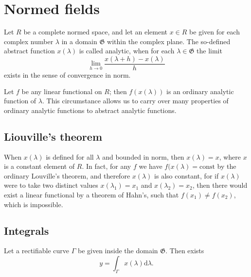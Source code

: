 \documentclass{article}
\theoremstyle{definition}
\newcommand{\intd}[3]{\int_{#1}{#2}\mathrm{d}#3}
\begin{document}
\section{Normed fields}
Let $R$ be a complete normed space, and let an element $x\in R$ be given for each complex number $\lambda$ in a domain $\mathfrak{G}$ within the complex plane. The so-defined abstract function $x(\lambda)$ is called analytic, when for each $\lambda\in\mathfrak{G}$ the limit
$$ \lim_{h\to0}\frac{x(\lambda+h)-x(\lambda)}h $$
exists in the sense of convergence in norm.

Let $f$ be any linear functional on $R$; then $f(x(\lambda))$ is an ordinary analytic function of $\lambda$. This circumstance allows us to carry over many properties of ordinary analytic functions to abstract analytic functions.

\subsection{Liouville's theorem}
When $x(\lambda)$ is defined for all $\lambda$ and bounded in norm, then $x(\lambda)=x$, where $x$ is a constant element of $R$. In fact, for any $f$ we have $f(x(\lambda)=\textrm{const}$ by the ordinary Louville's theorem, and therefore $x(\lambda)$ is also constant, for if $x(\lambda)$ were to take two distinct values $x(\lambda_1)=x_1$ and $x(\lambda_2)=x_2$, then there would exist a linear functional by a theorem of Hahn's, such that $f(x_1)\neq f(x_2)$, which is impossible.

\subsection{Integrals}
Let a rectifiable curve $\Gamma$ be given inside the domain $\mathfrak{G}$. Then exists
$$ y = \intd{\Gamma}{x(\lambda)}{\lambda}. $$
\end{document}
